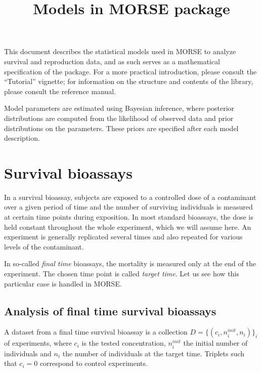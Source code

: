 \documentclass{article}
\title{Models in MORSE package}
\begin{document}


\maketitle

This document describes the statistical models used in MORSE to
analyze survival and reproduction data, and as such serves as a
mathematical specification of the package. For a more practical
introduction, please consult the ``Tutorial'' vignette; for
information on the structure and contents of the library, please
consult the reference manual.

Model parameters are estimated using Bayesian inference,
where posterior distributions are computed from the
likelihood of observed data and prior distributions on the
parameters. These priors are specified after each model description.

\section{Survival bioassays}
In a survival bioassay, subjects are exposed to a controlled dose of a
contaminant over a given period of time and the number of surviving
individuals is measured at certain time points during exposition. In
most standard bioassays, the dose is held constant throughout the
whole experiment, which we will assume here. An experiment is
generally replicated several times and also repeated for various
levels of the contaminant.

In so-called \emph{final time} bioassays, the mortality is measured
only at the end of the experiment. The chosen time point is called
\emph{target time}. Let us see how this particular case is handled in
MORSE.

\subsection{Analysis of final time survival bioassays}

A dataset from a final time survival bioassay is a collection $D = \{
(c_i, n_i^{init}, n_i) \}_i$ of experiments, where $c_i$ is the tested
concentration, $n_i^{init}$ the initial number of individuals and
$n_i$ the number of individuals at the target time. Triplets such that
$c_i = 0$ correspond to control experiments.
\end{document}
